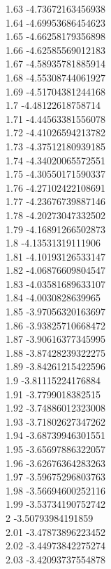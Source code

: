 {1.63	-4.73672163456938\\
1.64	-4.69953686454623\\
1.65	-4.66258179356898\\
1.66	-4.62585569012183\\
1.67	-4.58935781885914\\
1.68	-4.55308744061927\\
1.69	-4.51704381244168\\
1.7	-4.48122618758714\\
1.71	-4.44563381556078\\
1.72	-4.41026594213782\\
1.73	-4.37512180939185\\
1.74	-4.34020065572551\\
1.75	-4.30550171590337\\
1.76	-4.27102422108691\\
1.77	-4.23676739887146\\
1.78	-4.20273047332502\\
1.79	-4.16891266502873\\
1.8	-4.13531319111906\\
1.81	-4.10193126533147\\
1.82	-4.06876609804547\\
1.83	-4.03581689633107\\
1.84	-4.0030828639965\\
1.85	-3.97056320163697\\
1.86	-3.93825710668472\\
1.87	-3.90616377345995\\
1.88	-3.87428239322275\\
1.89	-3.84261215422596\\
1.9	-3.81115224176884\\
1.91	-3.7799018382515\\
1.92	-3.74886012323008\\
1.93	-3.71802627347262\\
1.94	-3.68739946301551\\
1.95	-3.65697886322057\\
1.96	-3.62676364283263\\
1.97	-3.59675296803763\\
1.98	-3.56694600252116\\
1.99	-3.53734190752742\\
2	-3.50793984191859\\
2.01	-3.47873896223452\\
2.02	-3.44973842275274\\
2.03	-3.42093737554878\\
}
